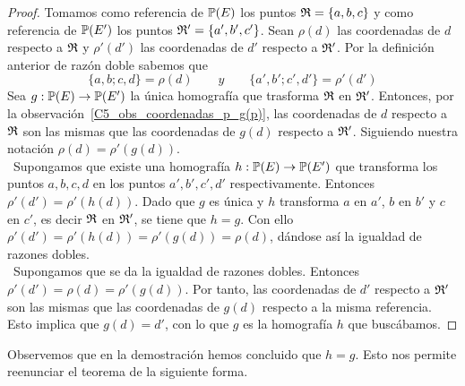 \begin{proof} Tomamos como referencia de $\mathbb{P}(E)$ los puntos $\mathfrak{R}=\{a,b,c\}$ y como referencia de $\mathbb{P}(E')$ los puntos $\mathfrak{R}'=\{a',b',c'\}$. Sean $\rho(d)$ las coordenadas de $d$ respecto a $\mathfrak{R}$ y $\rho'(d')$ las coordenadas de $d'$ respecto a $\mathfrak{R}'$. Por la definición anterior de razón doble sabemos que 
\begin{equation*}
	\{a,b;c,d\}=\rho(d) \qquad y \qquad \{a',b';c',d'\}=\rho'(d')
\end{equation*}
Sea $g:\mathbb{P}(E)\rightarrow \mathbb{P}(E')$ la única homografía que trasforma $\mathfrak{R}$ en $\mathfrak{R'}$. Entonces, por la observación~\ref{C5_obs_coordenadas_p_g(p)}, las coordenadas de $d$ respecto a $\mathfrak{R}$ son las mismas que las coordenadas de $g(d)$ respecto a $\mathfrak{R'}$. Siguiendo nuestra notación $\rho(d)=\rho'(g(d))$.\\

\bra \ Supongamos que existe una homografía $h:\mathbb{P}(E)\rightarrow \mathbb{P}(E')$ que transforma los puntos $a,b,c,d$ en los puntos $a',b',c',d'$ respectivamente. Entonces $\rho'(d')=\rho'(h(d))$. Dado que $g$ es única y $h$ transforma $a$ en $a'$, $b$ en $b'$ y $c$ en $c'$, es decir $\mathfrak{R}$ en $\mathfrak{R'}$, se tiene que $h=g$. Con ello \\
$\rho'(d')=\rho'(h(d))=\rho'(g(d))=\rho(d)$, dándose así la igualdad de razones dobles.\\

\bla \ Supongamos que se da la igualdad de razones dobles. Entonces $\rho'(d')=\rho(d)=\rho'(g(d))$. Por tanto, las coordenadas de $d'$ respecto a $\mathfrak{R}'$ son las mismas que las coordenadas de $g(d)$ respecto a la misma referencia. Esto implica que $g(d)=d'$, con lo que $g$ es la homografía $h$ que buscábamos.
\end{proof}
Observemos que en la demostración hemos concluido que $h=g$. Esto nos permite reenunciar el teorema de la siguiente forma.\\

